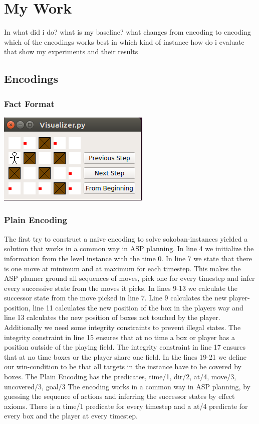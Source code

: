 \documentclass{article}
\begin{document}
\section{My Work}
In 
what did i do?
what is my baseline?
what changes from encoding to encoding
which of the encodings works best in which kind of instance
how do i evaluate that
show my experiments and their results
\subsection{Encodings}
\subsubsection{Fact Format}
\includegraphics{Visualizer}

\subsubsection{Plain Encoding}

The first try to construct a naive encoding to solve sokoban-instances yielded a solution that works in a common way in ASP planning. In line 4 we initialize the information from the level instance with the time 0. In line 7 we state that there is one move at minimum and at maximum for each timestep. This makes the ASP planner ground all sequences of moves, pick one for every timestep and infer every successive state from the moves it picks. In lines 9-13 we calculate the successor state from the move picked in line 7. Line 9 calculates the new player-position, line 11 calculates the new position of the box in the players way and line 13 calculates the new position of boxes not touched by the player. Additionally we need some integrity constraints to prevent illegal states. The integrity constraint in line 15 ensures that at no time a box or player has a position outside of the playing field. The integrity constraint in line 17 ensures that at no time boxes or the player share one field.
In the lines 19-21 we define our win-condition to be that all targets in the instance have to be covered by boxes.
The Plain Encoding has the predicates, time/1, dir/2, at/4, move/3, uncovered/3, goal/3
The encoding works in a common way in ASP planning, by guessing the sequence of actions and inferring the successor states by effect axioms. There is a time/1 predicate for every timestep and a at/4 predicate for every box and the player at every timestep.
\end{document}

